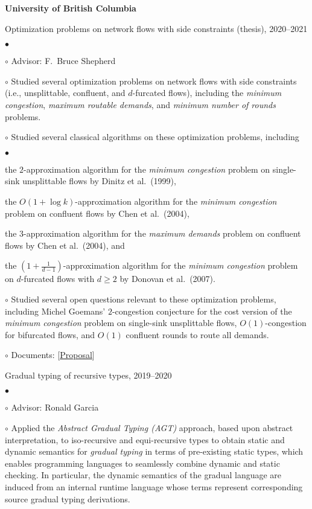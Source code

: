 \documentclass[margin,line]{res}
\newenvironment{list2}{
  \begin{list}{$\bullet$}{%
      \setlength{\itemsep}{0in}
      \setlength{\parsep}{0in} \setlength{\parskip}{0in}
      \setlength{\topsep}{0in} \setlength{\partopsep}{0in}
      \setlength{\leftmargin}{0.2in}}}{\end{list}}
\newenvironment{list3}{
  \begin{list}{\ding{113}}{%
      \setlength{\itemsep}{0.05in}
      \setlength{\parsep}{0.025in} \setlength{\parskip}{0in}
      \setlength{\topsep}{0in} \setlength{\partopsep}{0in}
      \setlength{\leftmargin}{0.17in}}}{\end{list}}
\begin{document}
\begin{resume}
{\bf University of British Columbia}\\
\vspace*{-.1in}
\begin{list3}
\item[] Optimization problems on network flows with side constraints (thesis), 2020--2021
  \begin{list2}
  \item[$\circ$] Advisor: F.\ Bruce Shepherd
  \item[$\circ$] Studied several optimization problems on network flows with side constraints (i.e., unsplittable, confluent, and $d$-furcated flows), including the \emph{minimum congestion}, \emph{maximum routable demands}, and \emph{minimum number of rounds} problems.
  \item[$\circ$] Studied several classical algorithms on these optimization problems, including
  \begin{list2}
    \item the $2$-approximation algorithm for the \emph{minimum congestion} problem on single-sink unsplittable flows by Dinitz et al.\ (1999),
    \item the $O(1 + \log k)$-approximation algorithm for the \emph{minimum congestion} problem on confluent flows by Chen et al.\ (2004),
    \item the $3$-approximation algorithm for the \emph{maximum demands} problem on confluent flows by Chen et al.\ (2004), and
    \item the $(1 + \frac{1}{d - 1})$-approximation algorithm for the \emph{minimum congestion} problem on $d$-furcated flows with $d \geq 2$ by Donovan et al.\ (2007).
  \end{list2}
  \item[$\circ$] Studied several open questions relevant to these optimization problems, including Michel Goemans' $2$-congestion conjecture for the cost version of the \emph{minimum congestion} problem on single-sink unsplittable flows, $O(1)$-congestion for bifurcated flows, and $O(1)$ confluent rounds to route all demands.
  \item[$\circ$] Documents: [\href{https://ypan.me/docs/thesis-proposal.pdf}{Proposal}]
  \end{list2}
\item[] Gradual typing of recursive types, 2019--2020
  \begin{list2}
  \item[$\circ$] Advisor: Ronald Garcia
  \item[$\circ$] Applied the \emph{Abstract Gradual Typing (AGT)} approach, based upon abstract interpretation, to iso-recursive and equi-recursive types to obtain static and dynamic semantics for \emph{gradual typing} in terms of pre-existing static types, which enables programming languages to seamlessly combine dynamic and static checking. In particular, the dynamic semantics of the gradual language are induced from an internal runtime language whose terms represent corresponding source gradual typing derivations.

\end{list2}
\end{list3}
\end{resume}
\end{document}
